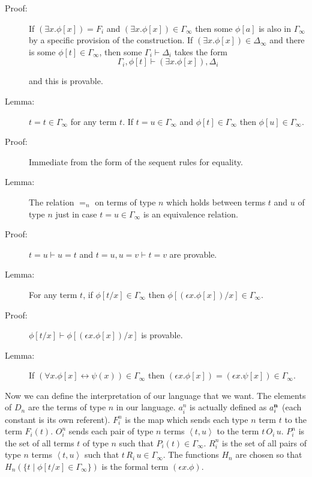 \documentclass[12pt]{book}
\begin{document}
\begin{description}
\item[Proof:] If $(\exists x.\phi[x]) = F_i$ and $(\exists x.\phi[x])
\in \Gamma_{\infty}$ then some $\phi[a]$ is also in $\Gamma_{\infty}$
by a specific provision of the construction.  If $(\exists x.\phi[x]) \in \Delta_{\infty}$ and there is some $\phi[t] \in \Gamma_{\infty}$, then some
$\Gamma_i\vdash\Delta_i$ takes the form
$$\Gamma_i,\phi[t]\vdash(\exists x.\phi[x]),\Delta_i$$

and this is  provable.

\item[Lemma:]  $t=t \in \Gamma_{\infty}$ for any term $t$.  If $t=u \in \Gamma_{\infty}$ and $\phi[t] \in \Gamma_{\infty}$ then $\phi[u] \in \Gamma_{\infty}$.

\item[Proof:]  Immediate from the form of the sequent rules for equality.

\item[Lemma:] The relation $=_n$ on terms of type $n$ which holds
between terms $t$ and $u$ of type $n$ just in case $t=u \in
\Gamma_{\infty}$ is an equivalence relation.

\item[Proof:]  $t=u \vdash u=t$ and $t=u,u=v\vdash t=v$ are provable.

\item[Lemma:]  For any term $t$, if $\phi[t/x] \in \Gamma_{\infty}$
then $\phi[(\epsilon x.\phi[x])/x] \in \Gamma_{\infty}$.  

\item[Proof:] $\phi[t/x] \vdash \phi[(\epsilon x.\phi[x])/x]$ is
provable.

\item[Lemma:]  If $(\forall x.\phi[x] \leftrightarrow \psi(x)) \in \Gamma_{\infty}$
then $(\epsilon x.\phi[x]) = (\epsilon x.\psi[x]) \in \Gamma_{\infty}$.

\end{description}

Now we can define the interpretation of our language that we want.
The elements of $D_n$ are the terms of type $n$ in our language.
$a^n_i$ is actually defined as $a^{\bf n}_i$ (each constant is its own
referent).  $F^n_i$ is the map which sends each type $n$ term $t$ to
the term $F_i(t)$.  $O^n_i$ sends each pair of type $n$ terms
$\left<t,u\right>$ to the term $t\,O_i\,u$.  $P^n_i$ is the set of all
terms $t$ of type $n$ such that $P_i(t) \in \Gamma_{\infty}$.  $R^n_i$
is the set of all pairs of type $n$ terms $\left<t,u\right>$ such that
$t \, R_i \, u \in \Gamma_{\infty}$.  The functions $H_n$ are chosen
so that $H_n(\{t \mid \phi[t/x] \in \Gamma_{\infty}\})$ is the formal
term $(\epsilon x.\phi)$.
\end{document}
